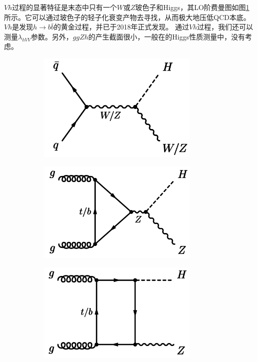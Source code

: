 $Vh$过程的显著特征是末态中只有一个$W$或$Z$玻色子和Higgs，其LO阶费曼图如图\ref{fig:diagram_VH}所示。它可以通过玻色子的轻子化衰变产物去寻找，从而极大地压低QCD本底。
$Vh$是发现$h\rightarrow b\bar{b}$的黄金过程，并已于2018年正式发现\cite{Aaboud:2018zhk,Sirunyan:2018kst}。
通过$Vh$过程，我们还可以测量$\lambda_{hVV}$参数。另外，$ggZh$的产生截面很小，一般在的Higgs性质测量中，没有考虑。\\
\begin{figure}[h]
\centering
 \begin{subfigure}[b]{0.33\textwidth}
  \includegraphics[width=0.85\textwidth]{fig/diagram_VH.png}
  \caption{}
  \label{fig:diagram_VH}
 \end{subfigure}
 \begin{subfigure}[b]{0.33\textwidth}
  \includegraphics[width=0.85\textwidth]{fig/diagram_ggZh1.png}
  \caption{}
  \label{fig:diagram_ggzh1}
 \end{subfigure}
 \begin{subfigure}[b]{0.33\textwidth}
  \includegraphics[width=0.85\textwidth]{fig/diagram_ggZh2.png}

\end{subfigure}
\end{figure}
